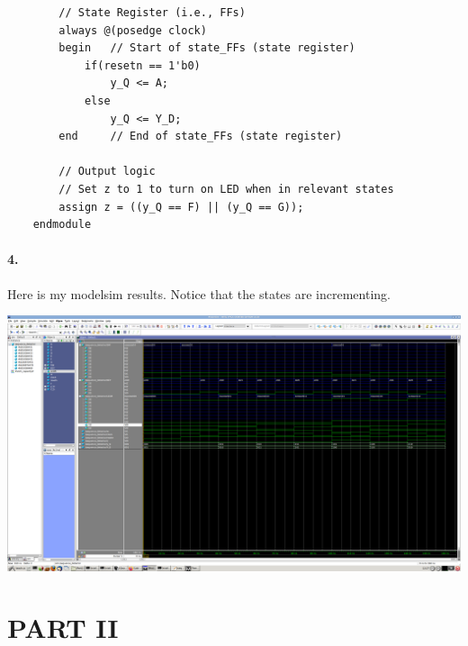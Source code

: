 \documentclass{article}
\begin{document}
\begin{verbatim}
        // State Register (i.e., FFs)
        always @(posedge clock)
        begin   // Start of state_FFs (state register)
            if(resetn == 1'b0)
                y_Q <= A;
            else
                y_Q <= Y_D;
        end     // End of state_FFs (state register)

        // Output logic
        // Set z to 1 to turn on LED when in relevant states
        assign z = ((y_Q == F) || (y_Q == G));  
    endmodule
\end{verbatim}
\paragraph{4.} Here is my modelsim results. Notice that the states are incrementing. 
\begin{center}
    \includegraphics[scale=0.19]{q1_modelsim.png}
\end{center}

\section*{PART II}
\end{document}
